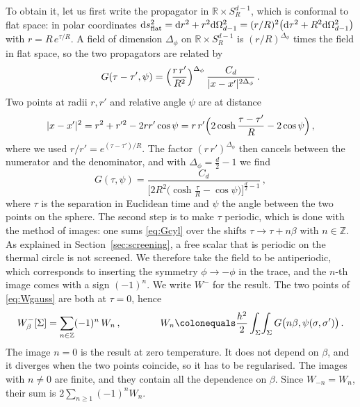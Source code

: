 \documentclass[a4paper,11pt]{article}
\newcommand{\dd}{\mathrm{d}}
\begin{document}
	To obtain it, let us first write the propagator in  $\mathbb{R}\times S^{d-1}_R$, which is conformal to flat space: in polar coordinates $\dd s^2_{\rm flat}=\dd r^2+r^2\dd\Omega_{d-1}^2=(r/R)^2\bigl(\dd\tau^2+R^2\dd\Omega_{d-1}^2\bigr)$ with $r=R\,e^{\tau/R}$. 
	A field of dimension $\Delta_\phi$ on $\mathbb{R}\times S^{d-1}_R$ is $(r/R)^{\Delta_\phi}$ times the field in flat space, so the two propagators are related by
	\begin{equation}
		G(\tau-\tau',\psi)=\Bigl(\frac{r\,r'}{R^2}\Bigr)^{\Delta_\phi}\,\frac{C_d}{|x-x'|^{2\Delta_\phi}}\, .
	\end{equation}
	Two points at radii $r,r'$ and relative angle $\psi$ are at distance
	\begin{equation}
		|x-x'|^2=r^2+r'^2-2rr'\cos\psi=r\,r'\Bigl(2\cosh\frac{\tau-\tau'}{R}-2\cos\psi\Bigr)\, ,
	\end{equation}
	where we used $r/r'=e^{(\tau-\tau')/R}$. The factor $(r\,r')^{\Delta_\phi}$ then cancels between the numerator and the denominator, and with $\Delta_\phi=\tfrac d2-1$ we find
	\begin{equation}\label{eq:Gcyl}
		G(\tau,\psi)=\frac{C_d}{\bigl[2R^2\bigl(\cosh\frac{\tau}{R}-\cos\psi\bigr)\bigr]^{\frac d2-1}}\, ,
	\end{equation}
	where $\tau$ is the separation in Euclidean time and $\psi$ the angle between the two points on the sphere. The second step is to make $\tau$ periodic, which is done with the method of images: one sums \eqref{eq:Gcyl} over the shifts $\tau\to\tau+n\beta$ with $n\in\mathbb{Z}$. As explained in Section~\ref{sec:screening}, a free scalar that is periodic on the thermal circle is not screened. We therefore take the field to be antiperiodic, which corresponds to inserting the symmetry $\phi\to-\phi$ in the trace, and the $n$-th image comes with a sign $(-1)^n$. We write $W^-$ for the result. The two points of \eqref{eq:Wgauss} are both at $\tau=0$, hence
	\begin{equation}\label{eq:Wimages}
		W^-_\beta[\Sigma]=\sum_{n\in\mathbb{Z}}(-1)^n\,W_n\, ,\qquad\qquad
		W_n\colonequals\frac{h^2}{2}\int_\Sigma\!\int_\Sigma G\bigl(n\beta,\psi(\sigma,\sigma')\bigr)\, .
	\end{equation}
	The image $n=0$ is the result at zero temperature. It does not depend on $\beta$, and it diverges when the two points coincide, so it has to be regularised. The images with $n\neq0$ are finite, and they contain all the dependence on $\beta$. Since $W_{-n}=W_n$, their sum is $2\sum_{n\ge1}(-1)^nW_n$.
	
\end{document}
